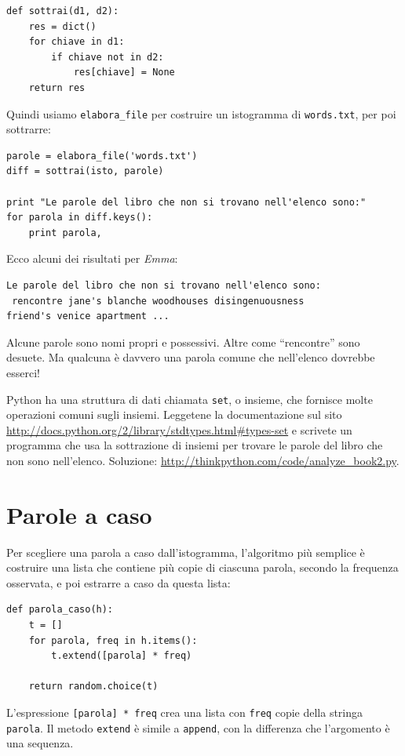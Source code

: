 \documentclass[10pt]{book}
\begin{document}
\begin{verbatim}
def sottrai(d1, d2):
    res = dict()
    for chiave in d1:
        if chiave not in d2:
            res[chiave] = None
    return res
\end{verbatim}
%
Quindi usiamo \verb"elabora_file" per costruire un istogramma di
{\tt words.txt}, per poi sottrarre:

\begin{verbatim}
parole = elabora_file('words.txt')
diff = sottrai(isto, parole)

print "Le parole del libro che non si trovano nell'elenco sono:"
for parola in diff.keys():
    print parola,
\end{verbatim}
%
Ecco alcuni dei risultati per {\em Emma}:

\begin{verbatim}
Le parole del libro che non si trovano nell'elenco sono:
 rencontre jane's blanche woodhouses disingenuousness 
friend's venice apartment ...
\end{verbatim}
%
Alcune parole sono nomi propri e possessivi. Altre come ``rencontre'' sono desuete. Ma qualcuna è davvero una parola comune che nell'elenco dovrebbe esserci!

\begin{exercise}

Python ha una struttura di dati chiamata {\tt set}, o insieme, che fornisce molte operazioni comuni sugli insiemi. Leggetene la documentazione sul sito  
\url{http://docs.python.org/2/library/stdtypes.html#types-set} e scrivete un programma che usa la sottrazione di insiemi per trovare le parole del libro che non sono nell'elenco. Soluzione:
\url{http://thinkpython.com/code/analyze_book2.py}.

\end{exercise}


\section{Parole a caso}
\label{randomwords}

Per scegliere una parola a caso dall'istogramma, l'algoritmo più semplice è  costruire una lista che contiene più copie di ciascuna parola, secondo la frequenza osservata, e poi estrarre a caso da questa lista:

\begin{verbatim}
def parola_caso(h):
    t = []
    for parola, freq in h.items():
        t.extend([parola] * freq)

    return random.choice(t)
\end{verbatim}
%
L'espressione {\tt [parola] * freq} crea una lista con {\tt freq}
copie della stringa {\tt parola}.  Il metodo {\tt extend}
è simile a {\tt append}, con la differenza che l'argomento è una sequenza.
\end{document}
